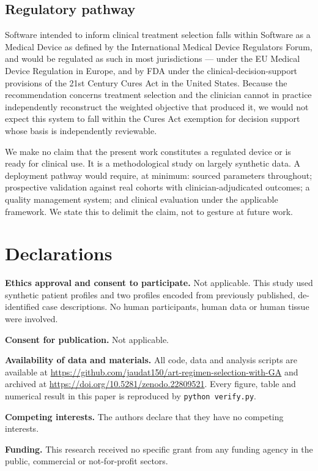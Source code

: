 \documentclass[conference]{IEEEtran}
\begin{document}
\subsection{Regulatory pathway}

Software intended to inform clinical treatment selection falls within Software as a Medical Device as defined by the International Medical Device Regulators Forum, and would be regulated as such in most jurisdictions --- under the EU Medical Device Regulation in Europe, and by FDA under the clinical-decision-support provisions of the 21st Century Cures Act in the United States. Because the recommendation concerns treatment selection and the clinician cannot in practice independently reconstruct the weighted objective that produced it, we would not expect this system to fall within the Cures Act exemption for decision support whose basis is independently reviewable.

We make no claim that the present work constitutes a regulated device or is ready for clinical use. It is a methodological study on largely synthetic data. A deployment pathway would require, at minimum: sourced parameters throughout; prospective validation against real cohorts with clinician-adjudicated outcomes; a quality management system; and clinical evaluation under the applicable framework. We state this to delimit the claim, not to gesture at future work.

\section{Declarations}\label{sec:declarations}

\textbf{Ethics approval and consent to participate.} Not applicable. This study used synthetic patient profiles and two profiles encoded from previously published, de-identified case descriptions. No human participants, human data or human tissue were involved.

\textbf{Consent for publication.} Not applicable.

\textbf{Availability of data and materials.} All code, data and analysis scripts are available at \url{https://github.com/jaudat150/art-regimen-selection-with-GA} and archived at \url{https://doi.org/10.5281/zenodo.22809521}. Every figure, table and numerical result in this paper is reproduced by \texttt{python verify.py}.

\textbf{Competing interests.} The authors declare that they have no competing interests.

\textbf{Funding.} This research received no specific grant from any funding agency in the public, commercial or not-for-profit sectors.
\end{document}
